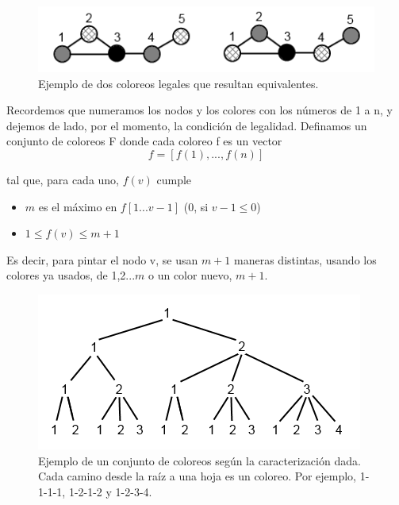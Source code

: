 \begin{figure}[H]
\label{fig:ejemploRepeticionColoreo}
\caption{Ejemplo de dos coloreos legales que resultan equivalentes.}
	\centering
	\includegraphics[scale=1]{ejemplo-mismos-coloreos.png}
\end{figure}



Recordemos que numeramos los nodos y los colores con los n\'umeros de 1 a n, y dejemos de lado, por el momento, la condici\'on de legalidad.
Definamos un conjunto de coloreos F donde cada coloreo f es un vector 
$$f = [f(1), ... , f(n)]$$


tal que, para cada uno, $f(v)$ cumple

\begin{itemize}
	\item $m$ es el m\'aximo en $f[1...v-1]$ (0, si $v-1 \leq 0$)
	\item $1 \leq f(v) \leq m+1$
\end{itemize}

Es decir, para pintar el nodo v, se usan $m+1$ maneras distintas, usando los colores ya usados, de 1,2...$m$ o un color nuevo, $m+1$.

\begin{figure}[H]
\label{fig:ejemploRepeticionColoreo}
	\centering
	\includegraphics[scale=1]{ejemplo-coloreos-distintos.png}
\caption{Ejemplo de un conjunto de coloreos seg\'un la caracterizaci\'on dada. Cada camino desde la ra\'iz a una hoja es un coloreo. Por ejemplo, 1-1-1-1, 1-2-1-2 y 1-2-3-4.}
\end{figure}



